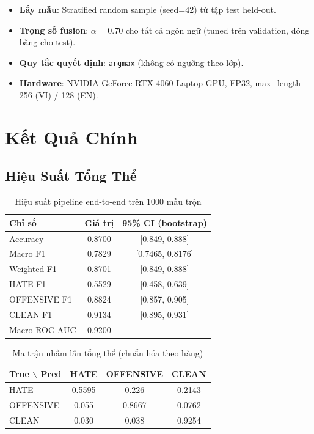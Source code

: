 \documentclass[11pt,a4paper]{article}
\begin{document}
\begin{itemize}
    \item \textbf{Lấy mẫu}: Stratified random sample (seed=42) từ tập test held-out.
    \item \textbf{Trọng số fusion}: $\alpha = 0.70$ cho tất cả ngôn ngữ (tuned trên validation, đóng băng cho test).
    \item \textbf{Quy tắc quyết định}: \texttt{argmax} (không có ngưỡng theo lớp).
    \item \textbf{Hardware}: NVIDIA GeForce RTX 4060 Laptop GPU, FP32, max\_length 256 (VI) / 128 (EN).
\end{itemize}

\section{Kết Quả Chính}
\label{sec:results}

\subsection{Hiệu Suất Tổng Thể}

\begin{table}[H]
    \centering
    \caption{Hiệu suất pipeline end-to-end trên 1000 mẫu trộn}
    \label{tab:aggregate}
    \begin{tabular}{lcc}
        \toprule
        Chỉ số        & Giá trị & 95\% CI (bootstrap) \\
        \midrule
        Accuracy      & 0.8700  & [0.849, 0.888]      \\
        Macro F1      & 0.7829  & [0.7465, 0.8176]      \\
        Weighted F1   & 0.8701  & [0.849, 0.888]      \\
        HATE F1       & 0.5529  & [0.458, 0.639]      \\
        OFFENSIVE F1  & 0.8824  & [0.857, 0.905]      \\
        CLEAN F1      & 0.9134  & [0.895, 0.931]      \\
        Macro ROC-AUC & 0.9200  & ---                 \\
        \bottomrule
    \end{tabular}
\end{table}

\begin{table}[H]
    \centering
    \caption{Ma trận nhầm lẫn tổng thể (chuẩn hóa theo hàng)}
    \label{tab:cm_overall}
    \begin{tabular}{lccc}
        \toprule
        True $\backslash$ Pred & HATE  & OFFENSIVE & CLEAN \\
        \midrule
        HATE                   & 0.5595 & 0.226     & 0.2143 \\
        OFFENSIVE              & 0.055 & 0.8667     & 0.0762 \\
        CLEAN                  & 0.030 & 0.038     & 0.9254 \\
        \bottomrule
    \end{tabular}
\end{table}
\end{document}

